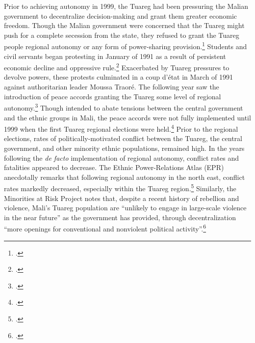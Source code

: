 \documentclass[12pt]{article}
\begin{document}
Prior to achieving autonomy in 1999, the Tuareg had been pressuring the Malian government to decentralize decision-making and grant them greater economic freedom. Though the Malian government were concerned that the Tuareg might push for a complete secession from the state, they refused to grant the Tuareg people regional autonomy or any form of power-sharing provision.\footcite{vogt_integrating_2015} Students and civil servants began protesting in January of 1991 as a result of persistent economic decline and oppressive rule.\footcite{unknown_malis_1991, unknown_leader_1991} Exacerbated by Tuareg pressures to devolve powers, these protests culminated in a coup d’état in March of 1991 against authoritarian leader Moussa Traoré. The following year saw the introduction of peace accords granting the Tuareg some level of regional autonomy.\footcite{humphreys_senegal_2005} Though intended to abate tensions between the central government and the ethnic groups in Mali, the peace accords were not fully implemented until 1999 when the first Tuareg regional elections were held.\footcite{keita_conflict_1998, seely_political_2001} Prior to the regional elections, rates of politically-motivated conflict between the Tuareg, the central government, and other minority ethnic populations, remained high. In the years following the \textit{de facto} implementation of regional autonomy, conflict rates and fatalities appeared to decrease. The Ethnic Power-Relations Atlas (EPR) anecdotally remarks that following regional autonomy in the north east, conflict rates markedly decreased, especially within the Tuareg region.\footcite{vogt_integrating_2015} Similarly, the Minorities at Risk Project notes that, despite a recent history of rebellion and violence, Mali's Tuareg population are ``unlikely to engage in large-scale violence in the near future'' as the government has provided, through decentralization ``more openings for conventional and nonviolent political activity''.\footcite{minorities_at_risk_project_minorities_2009}
\end{document}
